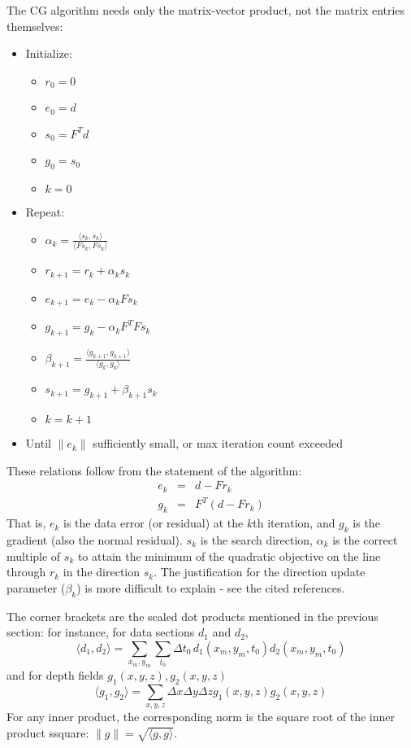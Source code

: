 The CG algorithm needs only the matrix-vector product, not the matrix entries themselves:
\begin{itemize}
\item Initialize:
\begin{itemize}
 \item $r_0 = 0$
  \item $e_0 = d$
  \item $s_0 = F^Td$
\item $g_0 = s_0$
  \item $k = 0$
\end{itemize}
\item Repeat:
\begin{itemize}
  \item $\alpha_k = \frac{\langle s_k,s_k \rangle}{\langle Fs_k,Fs_k\rangle}$
  \item $r_{k+1} = r_k + \alpha_k s_k$
 \item $e_{k+1} = e_k - \alpha_kFs_k$
\item $g_{k+1} = g_k - \alpha_k F^TFs_k$
  \item $\beta_{k+1} = \frac{\langle g_{k+1},g_{k+1}\rangle}{\langle g_k,g_k\rangle}$
  \item $s_{k+1}= g_{k+1}+\beta_{k+1}s_k$
  \item $k = k+1$
\end{itemize}
\item Until $\|e_k\|$ sufficiently small, or max iteration count exceeded 
\end{itemize}

These relations follow from the statement of the algorithm:
\begin{eqnarray}
\label{eqn:cgcons}
e_k & = & d - Fr_k\nonumber \\
g_k&=& F^T(d-Fr_k)
\end{eqnarray}
That is, $e_k$ is the data error (or residual) at the $k$th iteration, and $g_k$ is the gradient (also the normal residual). $s_k$ is the search direction, $\alpha_k$ is the correct multiple of $s_k$ to attain the minimum of the quadratic objective on the line through $r_k$ in the direction $s_k$. The justification for the direction update parameter ($\beta_k$) is more difficult to explain - see the cited references.

The corner brackets are the scaled dot products mentioned in the previous section: for instance,
 for data sections $d_1$ and $d_2$,
\begin{equation}
\label{eqn:dataip}
\langle d_1, d_2 \rangle = \sum_{x_m,y_m}  \sum_{t_0}\Delta t_0\,d_1(x_m,y_m,t_0) d_2(x_m,y_m,t_0) 
\end{equation}
and for depth fields $g_1(x,y,z), g_2(x,y,z)$
\begin{equation}
\label{eqn:modelip}
\langle g_1, g_2 \rangle = \sum_{x,y,z}  \Delta x \Delta y \Delta z g_1(x,y,z) g_2(x,y,z) 
\end{equation}
For any inner product, the corresponding norm is the square root of the inner product ssquare:
$\|g\|=\sqrt{\langle g,g\rangle}$. 

